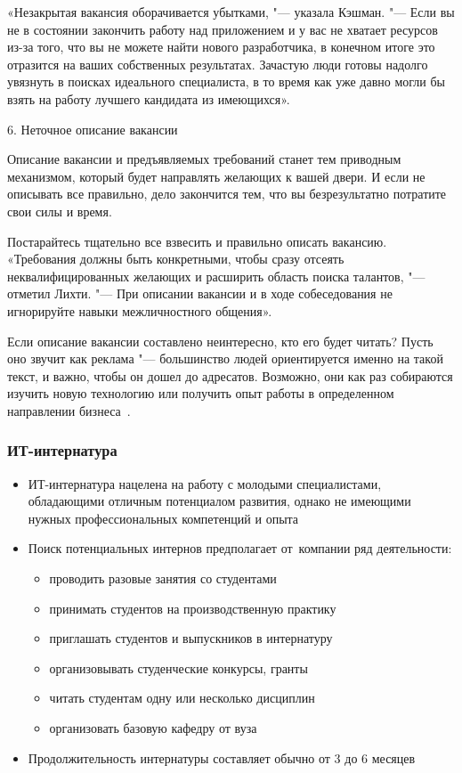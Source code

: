 \documentclass{../industrial-development}
\begin{document}
	«Незакрытая вакансия оборачивается убытками, "--- указала Кэшман. "--- Если вы не в состоянии закончить работу над приложением и у вас не хватает ресурсов из-за того, что вы не можете найти нового разработчика, в конечном итоге это отразится на ваших собственных результатах. Зачастую люди готовы надолго увязнуть в поисках идеального специалиста, в то время как уже давно могли бы взять на работу лучшего кандидата из имеющихся».
	
	6. \alert{Неточное описание вакансии}
	
	Описание вакансии и предъявляемых требований станет тем приводным механизмом, который будет направлять желающих к вашей двери. И если не описывать все правильно, дело закончится тем, что вы безрезультатно потратите свои силы и время.
	
	Постарайтесь тщательно все взвесить и правильно описать вакансию. «Требования должны быть конкретными, чтобы сразу отсеять неквалифицированных желающих и рас­ширить область поиска талантов, "--- отметил Лихти. "--- При описании вакансии и в ходе собеседования не игнорируйте навыки межличностного общения».
	
	Если описание вакансии составлено неинтересно, кто его будет читать? Пусть оно звучит как реклама "--- большинство людей ориентируется именно на такой текст, и важно, чтобы он дошел до адресатов. Возможно, они как раз собираются изучить новую технологию или получить опыт работы в определенном направлении бизнеса~\cite{RichHein}.
	
	\begin{frame} \frametitle{ИТ-интернатура}
		\begin{itemize}
			\item ИТ-интернатура нацелена на работу с молодыми специалистами, обладающими отличным потенциалом развития, однако не имеющими нужных профессиональных компетенций и опыта
			\item Поиск потенциальных интернов предполагает от~компании ряд деятельности:
			\begin{itemize}
				\item проводить разовые занятия со студентами
				\item	принимать студентов на производственную практику
				\item	приглашать студентов и выпускников в интернатуру
				\item	организовывать студенческие конкурсы, гранты
				\item	читать студентам одну или несколько дисциплин
				\item	организовать базовую кафедру от вуза
			\end{itemize}
			\item Продолжительность интернатуры составляет обычно от 3 до 6 месяцев
		\end{itemize}
	\end{frame}
	
\end{document}
